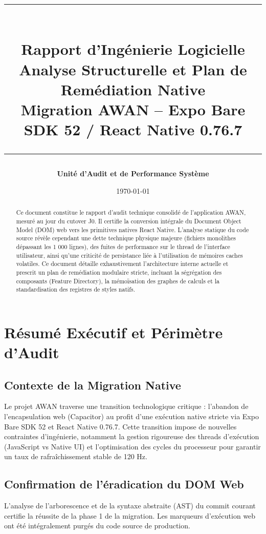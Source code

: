 \documentclass[11pt, a4paper]{article}
\title{
    \vspace{2cm}
    \rule{\textwidth}{2pt}\\[0.5cm]
    \textbf{\huge Rapport d'Ingénierie Logicielle}\\[0.5cm]
    \Large \textbf{Analyse Structurelle et Plan de Remédiation Native}\\[0.2cm]
    \large Migration AWAN -- Expo Bare SDK 52 / React Native 0.76.7\\[0.5cm]
    \rule{\textwidth}{2pt}
    \vspace{2cm}
}
\author{\textbf{Unité d'Audit et de Performance Système}}
\date{\today}
\begin{document}
\maketitle
\thispagestyle{empty}

\vfill

\begin{abstract}
\noindent Ce document constitue le rapport d'audit technique consolidé de l'application AWAN, mesuré au jour du cutover J0. Il certifie la conversion intégrale du Document Object Model (DOM) web vers les primitives natives React Native. L'analyse statique du code source révèle cependant une dette technique physique majeure (fichiers monolithes dépassant les 1 000 lignes), des fuites de performance sur le thread de l'interface utilisateur, ainsi qu'une criticité de persistance liée à l'utilisation de mémoires caches volatiles. Ce document détaille exhaustivement l'architecture interne actuelle et prescrit un plan de remédiation modulaire stricte, incluant la ségrégation des composants (Feature Directory), la mémoïsation des graphes de calculs et la standardisation des registres de styles natifs.
\end{abstract}

\vfill
\newpage

\tableofcontents
\thispagestyle{empty}
\newpage

\setcounter{page}{1}
\section{Résumé Exécutif et Périmètre d'Audit}

\subsection{Contexte de la Migration Native}
Le projet AWAN traverse une transition technologique critique : l'abandon de l'encapsulation web (Capacitor) au profit d'une exécution native stricte via Expo Bare SDK 52 et React Native 0.76.7. Cette transition impose de nouvelles contraintes d'ingénierie, notamment la gestion rigoureuse des threads d'exécution (JavaScript vs Native UI) et l'optimisation des cycles du processeur pour garantir un taux de rafraîchissement stable de 120 Hz.

\subsection{Confirmation de l'éradication du DOM Web}
L'analyse de l'arborescence et de la syntaxe abstraite (AST) du commit courant certifie la réussite de la phase 1 de la migration. Les marqueurs d'exécution web ont été intégralement purgés du code source de production.
\end{document}
